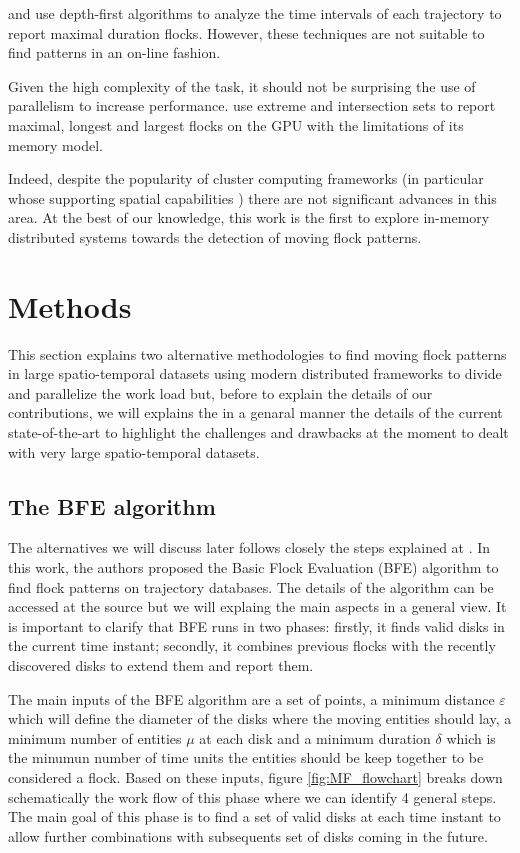 \documentclass[journal,onecolumn]{IEEEtran}
\begin{document}
\cite{arimura_finding_2014} and \cite{geng_enumeration_2014} use depth-first algorithms to analyze the time intervals of each trajectory to report maximal duration flocks.  However, these techniques are not suitable to find patterns in an on-line fashion.

Given the high complexity of the task, it should not be surprising the use of parallelism to increase performance.  \cite{fort_parallel_2014} use extreme and intersection sets to report maximal, longest and largest flocks on the GPU with the limitations of its memory model.  

Indeed, despite the popularity of cluster computing frameworks (in particular whose supporting spatial capabilities \cite{eldawy_spatialhadoop:_2014, yu_demonstration_2016, pellechia_geomesa:_2015-1, xie_simba:_2016-1}) there are not significant advances in this area.  At the best of our knowledge, this work is the first to explore in-memory distributed systems towards the detection of moving flock patterns.

\section{Methods}
This section explains two alternative methodologies to find moving flock patterns in large spatio-temporal datasets using modern distributed frameworks to divide and parallelize the work load but,  before to explain the details of our contributions, we will explains the in a genaral manner the details of the current state-of-the-art to highlight the challenges and drawbacks at the moment to dealt with very large spatio-temporal datasets.

\subsection{The BFE algorithm}
The alternatives we will discuss later follows closely the steps explained at \cite{vieira_2009}.  In this work, the authors proposed the Basic Flock Evaluation (BFE) algorithm to find flock patterns on trajectory databases.  The details of the algorithm can be accessed at the source but we will explaing the main aspects in a general view.  It is important to clarify that BFE runs in two phases: firstly, it finds valid disks in the current time instant; secondly, it combines previous flocks with the recently discovered disks to extend them and report them.  

The main inputs of the BFE algorithm are a set of points, a minimum distance $\varepsilon$ which will define the diameter of the disks where the moving entities should lay, a minimum number of entities $\mu$ at each disk and a minimum duration $\delta$ which is the minumun number of time units the entities should be keep together to be considered a flock.  Based on these inputs,  figure \ref{fig:MF_flowchart} breaks down schematically the work flow  of this phase where we can identify 4 general steps.  The main goal of this phase is to find a set of valid disks at each time instant to allow further combinations with subsequents set of disks coming in the future.
\end{document}
